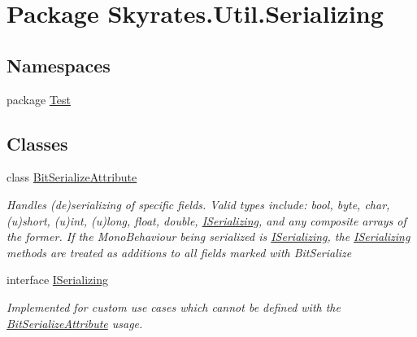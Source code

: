 \hypertarget{namespace_skyrates_1_1_util_1_1_serializing}{\section{Package Skyrates.\-Util.\-Serializing}
\label{namespace_skyrates_1_1_util_1_1_serializing}
}
\subsection*{Namespaces}
\begin{DoxyCompactItemize}
\item 
package \hyperlink{namespace_skyrates_1_1_util_1_1_serializing_1_1_test}{Test}
\end{DoxyCompactItemize}
\subsection*{Classes}
\begin{DoxyCompactItemize}
\item 
class \hyperlink{class_skyrates_1_1_util_1_1_serializing_1_1_bit_serialize_attribute}{Bit\-Serialize\-Attribute}
\begin{DoxyCompactList}\small\item\em Handles (de)serializing of specific fields. Valid types include\-: bool, byte, char, (u)short, (u)int, (u)long, float, double, \hyperlink{interface_skyrates_1_1_util_1_1_serializing_1_1_i_serializing}{I\-Serializing}, and any composite arrays of the former. If the Mono\-Behaviour being serialized is \hyperlink{interface_skyrates_1_1_util_1_1_serializing_1_1_i_serializing}{I\-Serializing}, the \hyperlink{interface_skyrates_1_1_util_1_1_serializing_1_1_i_serializing}{I\-Serializing} methods are treated as additions to all fields marked with Bit\-Serialize \end{DoxyCompactList}\item 
interface \hyperlink{interface_skyrates_1_1_util_1_1_serializing_1_1_i_serializing}{I\-Serializing}
\begin{DoxyCompactList}\small\item\em Implemented for custom use cases which cannot be defined with the \hyperlink{class_skyrates_1_1_util_1_1_serializing_1_1_bit_serialize_attribute}{Bit\-Serialize\-Attribute} usage. \end{DoxyCompactList}\end{DoxyCompactItemize}

